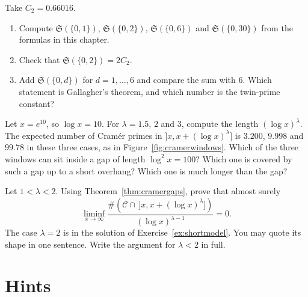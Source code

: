 \begin{exercise}[$\star\star$]\label{ex:threeS}
Take $C_2=0.66016$.
\begin{enumerate}[label=(\alph*)]
\item Compute $\mathfrak S(\{0,1\})$, $\mathfrak S(\{0,2\})$, $\mathfrak S(\{0,6\})$ and $\mathfrak S(\{0,30\})$ from the formulas in this chapter.
\item Check that $\mathfrak S(\{0,2\})=2C_2$.
\item Add $\mathfrak S(\{0,d\})$ for $d=1,\dots,6$ and compare the sum with $6$. Which statement is Gallagher's theorem, and which number is the twin-prime constant?
\end{enumerate}
\end{exercise}

\begin{exercise}[$\star\star$]\label{ex:windowe10}
Let $x=e^{10}$, so $\log x=10$. For $\lambda=1.5$, $2$ and $3$, compute the length $(\log x)^\lambda$. The expected number of Cramér primes in $]x,x+(\log x)^\lambda]$ is $3.200$, $9.998$ and $99.78$ in these three cases, as in Figure~\ref{fig:cramerwindows}. Which of the three windows can sit inside a gap of length $\log^2 x=100$? Which one is covered by such a gap up to a short overhang? Which one is much longer than the gap?
\end{exercise}

\begin{exercise}[$\star\star\star$]\label{ex:lambdaless}
Let $1<\lambda<2$. Using Theorem~\ref{thm:cramergaps}, prove that almost surely
\[
\liminf_{x\to\infty}\frac{\#(\mathcal C\cap\,]x,x+(\log x)^\lambda])}{(\log x)^{\lambda-1}}=0.
\]
The case $\lambda=2$ is in the solution of Exercise~\ref{ex:shortmodel}. You may quote its shape in one sentence. Write the argument for $\lambda<2$ in full.
\end{exercise}

\section{Hints}

